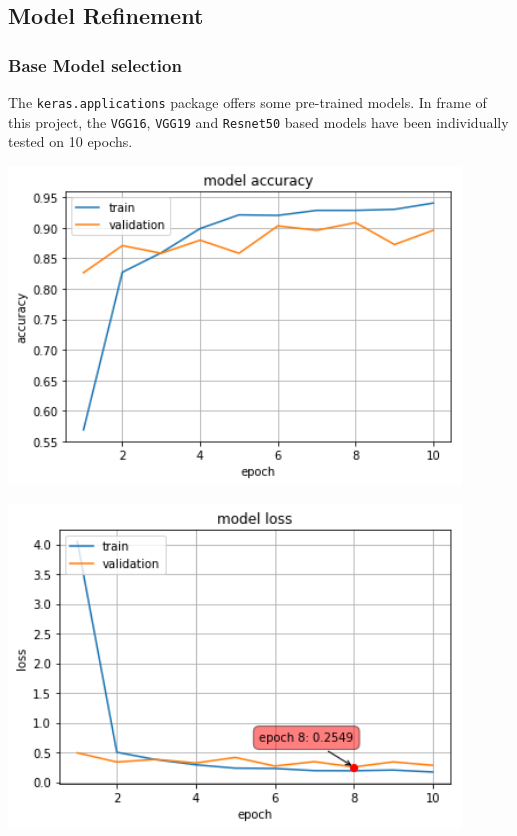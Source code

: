 \subsection{Model Refinement}

\subsubsection{Base Model selection}

The \texttt{keras.applications} package offers some pre-trained models. In frame of this project, the \texttt{VGG16}, \texttt{VGG19} and \texttt{Resnet50} based models have been individually tested on 10 epochs. 

\begin{center}
	\centering
	\begin{minipage}{0.5\textwidth}
		\centering
		\includegraphics[width=0.9\textwidth]{./sections/03_methodology/VGG16_10epochs_acc.png}
		\label{VGG16_10e_Acc}
	\end{minipage}\hfill
	\begin{minipage}{0.5\textwidth}
		\centering
		\includegraphics[width=0.9\textwidth]{./sections/03_methodology/VGG16_10epochs_loss.png} 
		\label{VGG16_10e_Loss}
	\end{minipage}
\end{center}

